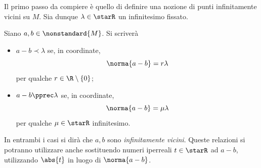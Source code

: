 

Il primo passo da compiere è quello di definire una nozione di punti infinitamente vicini su $ M $. Sia dunque $ \lambda \in \starR$ un infinitesimo fissato. 

Siano $ a,b \in \nonstandard{M} $. Si scriverà \begin{itemize}
    \item $ a-b \prec \lambda $ se, in coordinate, \begin{equation*}
        \norma{a-b} = r \lambda
    \end{equation*}per qualche $ r \in \R\setminus\{0\} $;
    \item $ a-b\pprec \lambda $ se, in coordinate, \begin{equation*}
        \norma{a- b} = \mu \lambda
    \end{equation*}per qualche $\mu \in \starR$ infinitesimo.
\end{itemize}In entrambi i casi si dirà che $ a,b $ sono \emph{infinitamente vicini}. Queste relazioni si potranno utilizzare anche sostituendo numeri iperreali $ t \in \starR $ ad $ a-b $, utilizzando $ \abs{t} $ in luogo di $ \norma{a-b} $. 






